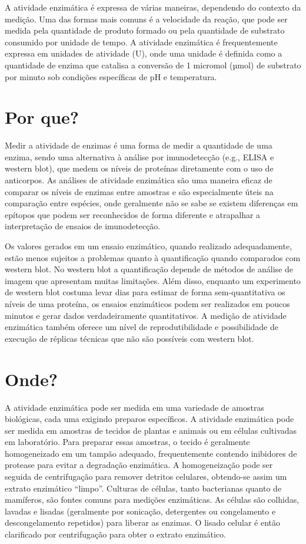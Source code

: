 \documentclass[
  9pt,
  american,
  a5paper,
  extrafontsizes,onecolumn,openright
  ]{memoir}
\begin{document}
A atividade enzimática é expressa de várias maneiras, dependendo do contexto da medição. Uma das formas mais comuns é a velocidade da reação, que pode ser medida pela quantidade de produto formado ou pela quantidade de substrato consumido por unidade de tempo. A atividade enzimática é frequentemente expressa em unidades de atividade (U), onde uma unidade é definida como a quantidade de enzima que catalisa a conversão de 1 micromol (µmol) de substrato por minuto sob condições específicas de pH e temperatura.

\section{Por que?}\label{por-que}

Medir a atividade de enzimas é uma forma de medir a quantidade de uma enzima, sendo uma alternativa à análise por imunodetecção (e.g., ELISA e western blot), que medem os níveis de proteínas diretamente com o uso de anticorpos. As análises de atividade enzimática são uma maneira eficaz de comparar os níveis de enzimas entre amostras e são especialmente úteis na comparação entre espécies, onde geralmente não se sabe se existem diferenças em epítopos que podem ser reconhecidos de forma diferente e atrapalhar a interpretação de ensaios de imunodetecção.

Os valores gerados em um ensaio enzimático, quando realizado adequadamente, estão menos sujeitos a problemas quanto à quantificação quando comparados com western blot. No western blot a quantificação depende de métodos de análise de imagem que apresentam muitas limitações. Além disso, enquanto um experimento de western blot costuma levar dias para estimar de forma sem-quantitativa os níveis de uma proteína, os ensaios enzimáticos podem ser realizados em poucos minutos e gerar dados verdadeiramente quantitativos. A medição de atividade enzimática também oferece um nível de reprodutibilidade e possibilidade de execução de réplicas técnicas que não são possíveis com western blot.

\section{Onde?}\label{onde}

A atividade enzimática pode ser medida em uma variedade de amostras biológicas, cada uma exigindo preparos específicos. A atividade enzimática pode ser medida em amostras de tecidos de plantas e animais ou em células cultivadas em laboratório. Para preparar essas amostras, o tecido é geralmente homogeneizado em um tampão adequado, frequentemente contendo inibidores de protease para evitar a degradação enzimática. A homogeneização pode ser seguida de centrifugação para remover detritos celulares, obtendo-se assim um extrato enzimático \enquote{limpo}. Culturas de células, tanto bacterianas quanto de mamíferos, são fontes comuns para medições enzimáticas. As células são colhidas, lavadas e lisadas (geralmente por sonicação, detergentes ou congelamento e descongelamento repetidos) para liberar as enzimas. O lisado celular é então clarificado por centrifugação para obter o extrato enzimático.
\end{document}
